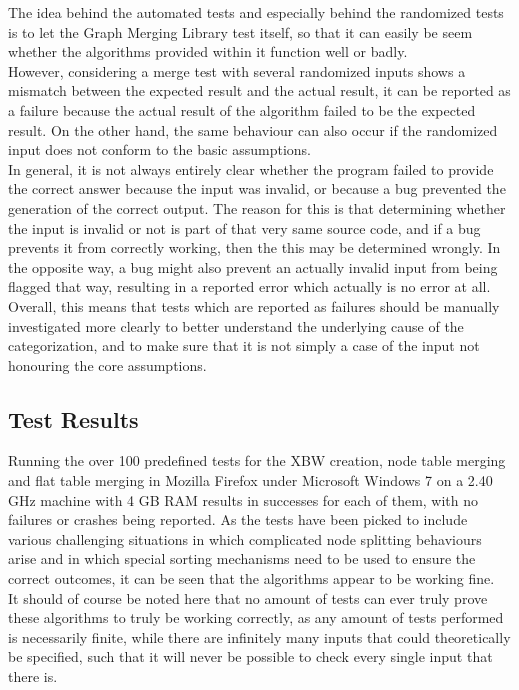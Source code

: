 \documentclass[a4paper,12pt,twoside,BCOR=10mm]{scrbook}
\begin{document}
The idea behind the automated tests and especially behind the randomized tests 
is to let the Graph Merging Library test itself,
so that it can easily be seem whether the algorithms provided within it 
function well or badly. \\
However, considering a merge test with several randomized inputs shows a mismatch 
between the expected result and the actual result, 
it can be reported as a failure because the actual result of the algorithm 
failed to be the expected result. 
On the other hand, the same behaviour can also occur if the randomized input 
does not conform to the basic assumptions. \\
In general, it is not always entirely clear whether the program failed to provide the correct answer 
because the input was invalid, or because a bug prevented the generation of the correct output. 
The reason for this is that determining whether the input is invalid or not is part of that 
very same source code, and if a bug prevents it from correctly working, then the this may be determined 
wrongly. In the opposite way, a bug might also prevent an actually invalid input from being 
flagged that way, resulting in a reported error which actually is no error at all. \\
Overall, this means that tests which are reported as failures should be manually investigated more clearly to 
better understand the underlying cause of the categorization, and to make sure that it is not simply a case 
of the input not honouring the core assumptions.

\subsection{Test Results}

Running the over 100 predefined tests for the XBW creation, node table merging 
and flat table merging in Mozilla Firefox under Microsoft Windows 7 on a 2.40 GHz machine with 4 GB RAM 
results in successes for each of them, 
with no failures or crashes being reported. 
As the tests have been picked to include various challenging situations 
in which complicated node splitting behaviours arise and in which 
special sorting mechanisms need to be used to ensure the correct outcomes, 
it can be seen that the algorithms appear to be working fine. \\
It should of course be noted here that no amount of tests can ever 
truly prove these algorithms to truly be working correctly, 
as any amount of tests performed is necessarily finite, while there are 
infinitely many inputs that could theoretically be specified, 
such that it will never be possible to check every single input that there is.
\end{document}
